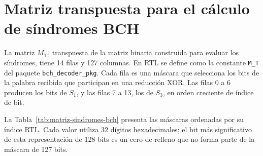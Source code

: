 \documentclass[10pt,a4paper]{article}
\begin{document}
\clearpage
\section{Matriz transpuesta para el cálculo de síndromes BCH}
\label{anexo:matriz-sindromes-bch}

La matriz $M_{\mathrm{T}}$, transpuesta de la matriz binaria construida
para evaluar los síndromes, tiene 14 filas y 127 columnas. En RTL se
define como la constante \texttt{M\_T} del paquete
\texttt{bch\_decoder\_pkg}. Cada fila es una máscara que selecciona los
bits de la palabra recibida que participan en una reducción XOR.
Las filas 0 a 6 producen los bits de $S_1$, y las filas 7 a 13, los
de $S_3$, en orden creciente de índice de bit.

La Tabla~\ref{tab:matriz-sindromes-bch} presenta las máscaras ordenadas
por su índice RTL. Cada valor utiliza 32 dígitos hexadecimales; el
bit más significativo de esta representación de 128 bits es un cero
de relleno que no forma parte de la máscara de 127 bits.
\end{document}
